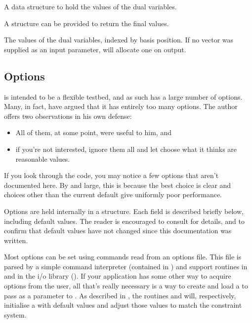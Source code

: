 \begin{codedoc}
  \item{} A data structure to hold the values of the dual variables.
  \begin{description}[\textbf{(o)}]
    \item[\textbf{(i)}]
    A structure can be provided to return the final values.

    \item[\textbf{(o)}]
    The values of the dual variables, indexed by basis position.
    If no vector was supplied as an input parameter, \dylp will allocate
    one on output.
  \end{description}
\end{codedoc}


\subsection{\dylp Options}
\label{DylpOptions}

\dylp is intended to be a flexible testbed, and as such has a large number of
options.
Many, in fact, have argued that it has entirely too many options.
The author offers two observations in his own defense:
\begin{itemize}
  \item
  All of them, at some point, were useful to him, and
  
  \item
  if you're not interested, ignore them all and
  let \dylp choose what it thinks are reasonable values.
\end{itemize}
If you look through the code, you may notice a few options that aren't
documented here.
By and large, this is because the best choice is clear and choices
other than the current default give uniformly poor performance.

Options are held internally in a  structure.
Each field is described briefly below, including default values.
The reader is encouraged to consult  for details, and
 to confirm that default values have not changed since
this documentation was written.

Most options can be set using commands read from an options file.
This file is parsed by a simple command interpreter (contained
in ) and support routines in  and
in the i/o library (\vid {}).
If your application has some other way to acquire options from the user,
all that's really necessary is a way to create and load
a  to pass as a parameter to .
As described in , the routines
 and  will, respectively, initialise
a  with default values and adjust those values to match
the constraint system.

